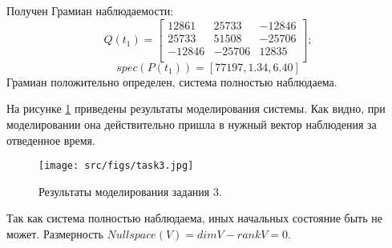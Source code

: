 Получен Грамиан наблюдаемости:
\[
        Q(t_1) = \begin{bmatrix}
        12861 & 25733 & -12846\\
        25733 & 51508 & -25706 \\
        -12846 & -25706 & 12835 \\
        \end{bmatrix};
\]
\[
        spec(P(t_1)) = [77197, 1.34, 6.40]
\]Грамиан положительно определен, система полностью наблюдаема.

На рисунке \ref{fig:task3} приведены результаты моделирования системы. Как видно, при моделировании она действительно пришла в нужный вектор наблюдения за отведенное время.
\begin{figure}[ht!]
        \centering
        \texttt{[image: src/figs/task3.jpg]}
        \caption{Результаты моделирования задания 3.}
        \label{fig:task3}
\end{figure}
Так как система полностью наблюдаема, иных начальных состояние быть не может. Размерность \(Nullspace(V) = dimV - rankV = 0\). 
